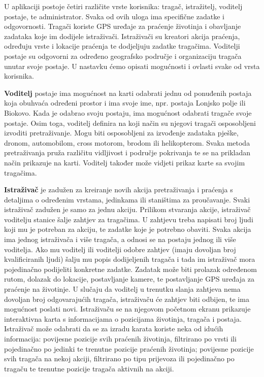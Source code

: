		U aplikaciji postoje četiri različite vrste korisnika: tragač, istražitelj, voditelj postaje, te administrator. Svaka od ovih uloga ima specifične zadatke i odgovornosti. Tragači koriste GPS uređaje za praćenje životinja i obavljanje zadataka koje im dodijele istraživači. Istraživači su kreatori akcija praćenja, određuju vrste i lokacije praćenja te dodjeljuju zadatke tragačima. Voditelji postaje su odgovorni za određeno geografsko područje i organizaciju tragača unutar svoje postaje. U nastavku ćemo opisati mogućnosti i ovlasti svake od vrsta korisnika. \newline
		
		\textbf{Voditelj} postaje ima mogućnost na karti odabrati jednu od ponuđenih postaja koja obuhvaća određeni prostor i ima svoje ime, npr. postaja Lonjsko polje ili Biokovo. Kada je odabrao svoju postaju, ima mogućnost odabrati tragače svoje postaje. Osim toga, voditelj definira na koji način su njegovi tragači osposobljeni izvoditi pretraživanje. Mogu biti osposobljeni za izvođenje zadataka pješke, dronom, automobilom, cross motorom, brodom ili helikopterom. Svaka metoda pretraživanja pruža različitu vidljivost i područje pokrivanja te se na prikladan način prikazuje na karti. Voditelj također može vidjeti prikaz karte sa svojim tragačima. \newline
		
		\textbf{Istraživač} je zadužen za kreiranje novih akcija pretraživanja i praćenja s detaljima o određenim vrstama, jedinkama ili staništima za proučavanje. Svaki istraživač zadužen je samo za jednu akciju. Prilikom stvaranja akcije, istraživač voditelju stanice šalje zahtjev za tragačima. U zahtjevu treba napisati broj ljudi koji mu je potreban za akciju, te zadatke koje je potrebno obaviti. Svaka akcija ima jednog istraživača i više tragača, a odnosi se na postaju jednog ili više voditelja. Ako mu voditelj ili voditelji odobre zahtjev (imaju dovoljan broj kvalificiranih ljudi) šalju mu popis dodijeljenih tragača i tada im istraživač mora pojedinačno podijeliti konkretne zadatke. Zadatak može biti prolazak određenom rutom, dolazak do lokacije, postavljanje kamere, te postavljanje GPS uređaja za praćenje na životinje.  U slučaju da voditelj u trenutku slanja zahtjeva nema dovoljan broj odgovarajućih tragača, istraživaču će zahtjev biti odbijen, te ima mogućnost poslati novi. Istraživaču se na njegovom početnom ekranu prikazuje interaktivna karta s informacijama o pozicijama životinja, tragača i postaja. Istraživač može odabrati da se za izradu karata koriste neka od idućih informacija: povijesne pozicije svih praćenih životinja, filtrirano po vrsti ili pojedinačno po jedinki te trenutne pozicije praćenih životinja; povijesne pozicije svih tragača na nekoj akciji, filtrirano po tipu prijevoza ili pojedinačno po tragaču te trenutne pozicije tragača aktivnih na akciji. \newline
		
